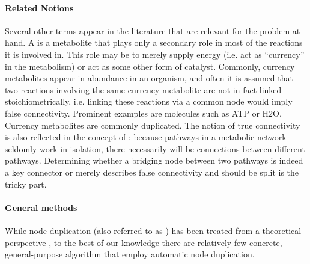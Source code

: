 \documentclass[
	fontsize=10pt, %
	twoside=false, %
	secnumdepth=1, %
  toc=indentunnumbered %
]{kaobook}
\begin{document}
\paragraph{Related Notions} Several other terms appear in the literature that
are relevant for the problem at hand. A 
\cite{huss_CurrencyCommodityMetabolites_2007}
is a metabolite that plays only a secondary
role in most of the reactions it is involved in. This role may be to merely
supply energy (i.e. act as ``currency'' in the metabolism) or act as some other
form of catalyst. Commonly, currency metabolites appear in abundance in an
organism, and often it is assumed that two reactions involving the same currency
metabolite are not in fact linked stoichiometrically, i.e. linking these
reactions via a common node would imply false connectivity. Prominent examples
are molecules such as ATP or H2O. Currency metabolites are commonly
duplicated.
The notion of true connectivity is also reflected in the concept of  \cite{kim_IdentificationCriticalConnectors_2019}: because pathways
in a metabolic network seldomly work in isolation, there necessarily will be
connections between different pathways. Determining whether a bridging node
between two pathways is indeed a key connector or merely describes false
connectivity and should be split is the tricky part.

\paragraph{General methods} While node duplication (also referred to as
) has been treated from a theoretical perspective
\cite{liebers_PlanarizingGraphsSurvey_2001}
\cite{abu-khzam_ClusterEditingVertex_2018},
to the best of our knowledge there are relatively few concrete, general-purpose
algorithm that employ automatic node duplication.
\end{document}
